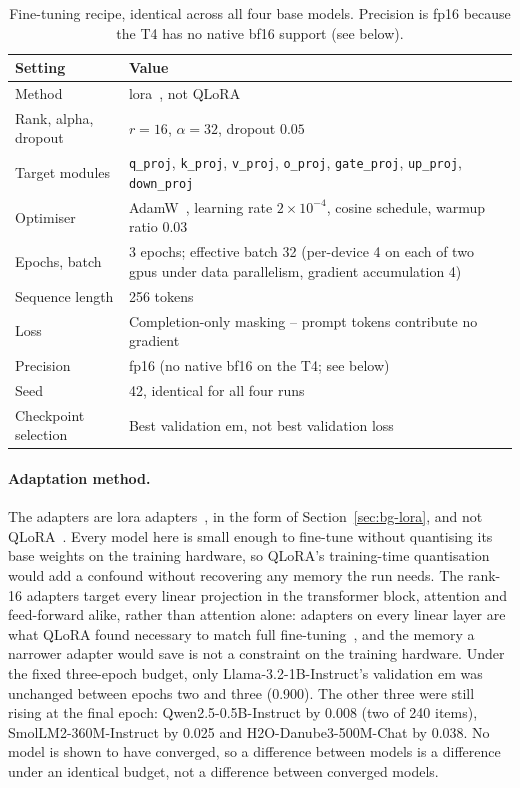 \begin{table}[htbp]
\centering
\caption[Fine-tuning recipe]{Fine-tuning recipe, identical across all four base models. Precision is fp16 because the
T4 has no native bf16 support (see below).}
\label{tab:lora}
\begin{tabularx}{\textwidth}{@{}l X@{}}
\toprule
Setting & Value \\
\midrule
Method & \acrshort{lora}~\cite{lora}, not QLoRA \\
Rank, alpha, dropout & $r = 16$, $\alpha = 32$, dropout $0.05$ \\
Target modules & \texttt{q\_proj}, \texttt{k\_proj}, \texttt{v\_proj}, \texttt{o\_proj}, \texttt{gate\_proj}, \texttt{up\_proj}, \texttt{down\_proj} \\
Optimiser & AdamW~\cite{adamw}, learning rate $2\times10^{-4}$, cosine schedule, warmup ratio $0.03$ \\
Epochs, batch & 3 epochs; effective batch 32 (per-device 4 on each of two \acrshort{gpu}s under data parallelism, gradient accumulation 4) \\
Sequence length & 256 tokens \\
Loss & Completion-only masking -- prompt tokens contribute no gradient \\
Precision & fp16 (no native bf16 on the T4; see below) \\
Seed & 42, identical for all four runs \\
Checkpoint selection & Best validation \acrshort{em}, not best validation loss \\
\bottomrule
\end{tabularx}
\end{table}

\paragraph{Adaptation method.} The adapters are \gls{lora} adapters~\cite{lora}, in the form of
Section~\ref{sec:bg-lora}, and not QLoRA~\cite{qlora}. Every model here is small enough to
fine-tune without quantising its base weights on the training hardware, so QLoRA's training-time
quantisation would add a confound without recovering any memory the run needs. The rank-16
adapters target every linear projection in the transformer block, attention and feed-forward
alike, rather than attention alone: adapters on every linear layer are what QLoRA found necessary
to match full fine-tuning~\cite{qlora}, and the memory a narrower adapter would save is not a
constraint on the training hardware. Under the fixed
three-epoch budget, only Llama-3.2-1B-Instruct's validation \gls{em} was unchanged between epochs
two and three (0.900). The other three were still rising at the final epoch: Qwen2.5-0.5B-Instruct
by 0.008 (two of 240 items), SmolLM2-360M-Instruct by 0.025 and H2O-Danube3-500M-Chat by 0.038. No
model is shown to have converged, so a difference between models is a difference under an identical
budget, not a difference between converged models.

